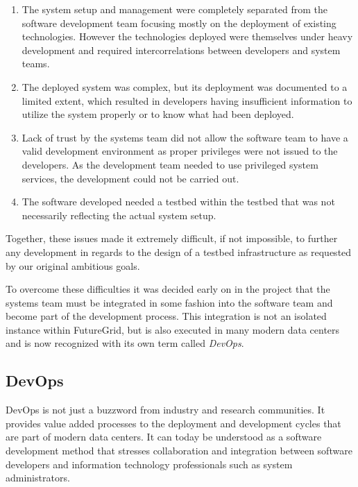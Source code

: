 \documentclass[graybox]{svmult}
\begin{document}
\begin{enumerate}


\item The system setup and management were completely separated from the software development team focusing mostly on the deployment of existing technologies. However the technologies deployed were themselves under heavy development and required intercorrelations between developers and system teams.


\item The deployed system was complex, but its deployment was documented to a limited extent, which resulted in developers having insufficient information to utilize the system properly or to know what had been deployed.


\item Lack of trust by the systems team did not allow the software team to have a valid development environment as proper privileges were not issued to the developers. As the development team needed to use privileged system services, the development could not be carried out.


\item The software developed needed a testbed within the testbed that was not necessarily reflecting the actual system setup.


\end{enumerate}


Together, these issues made it extremely difficult, if not impossible, to further any development in regards to the design of a testbed infrastructure as requested by our original ambitious goals.


To overcome these difficulties it was decided early on in the project that the systems team must be integrated in some fashion into the software team and become part of the development process. This integration is not an isolated instance within FutureGrid, but is also executed in many modern data centers and is now recognized with its own term called {\em DevOps}.


\subsection{DevOps}

DevOps is not just a buzzword from industry and research communities. It provides value added processes to the deployment and development cycles that are part of modern data centers. It can today be understood as a software development method that stresses collaboration and integration between software developers and information technology professionals such as system administrators.
\end{document}
